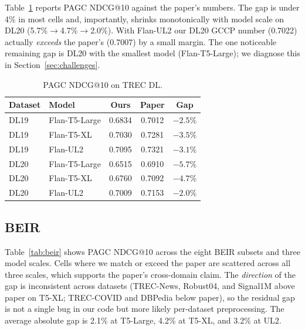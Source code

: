 \documentclass[conference]{IEEEtran}
\begin{document}
Table~\ref{tab:dl} reports PAGC NDCG@10 against the paper's numbers. The gap is under 4\% in most cells and, importantly, shrinks monotonically with model scale on DL20 (5.7\%$\rightarrow$4.7\%$\rightarrow$2.0\%). With Flan-UL2 our DL20 GCCP number (0.7022) actually \emph{exceeds} the paper's (0.7007) by a small margin. The one noticeable remaining gap is DL20 with the smallest model (Flan-T5-Large); we diagnose this in Section~\ref{sec:challenges}.

\begin{table}[h]
\centering
\small
\begin{tabular}{@{}llccc@{}}
\toprule
\textbf{Dataset} & \textbf{Model} & \textbf{Ours} & \textbf{Paper} & \textbf{Gap} \\
\midrule
DL19 & Flan-T5-Large & 0.6834 & 0.7012 & $-2.5\%$ \\
DL19 & Flan-T5-XL    & 0.7030 & 0.7281 & $-3.5\%$ \\
DL19 & Flan-UL2      & 0.7095 & 0.7321 & $-3.1\%$ \\
\midrule
DL20 & Flan-T5-Large & 0.6515 & 0.6910 & $-5.7\%$ \\
DL20 & Flan-T5-XL    & 0.6760 & 0.7092 & $-4.7\%$ \\
DL20 & Flan-UL2      & 0.7009 & 0.7153 & $-2.0\%$ \\
\bottomrule
\end{tabular}
\caption{PAGC NDCG@10 on TREC DL.}
\label{tab:dl}
\end{table}

\subsection{BEIR}

Table~\ref{tab:beir} shows PAGC NDCG@10 across the eight BEIR subsets and three model scales. Cells where we match or exceed the paper are scattered across all three scales, which supports the paper's cross-domain claim. The \emph{direction} of the gap is inconsistent across datasets (TREC-News, Robust04, and Signal1M above paper on T5-XL; TREC-COVID and DBPedia below paper), so the residual gap is not a single bug in our code but more likely per-dataset preprocessing. The average absolute gap is 2.1\% at T5-Large, 4.2\% at T5-XL, and 3.2\% at UL2.
\end{document}
